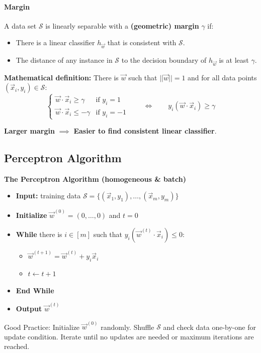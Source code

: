 \paragraph{Margin}
A data set $\mathcal{S}$ is linearly separable with a \textbf{(geometric) margin} $\gamma$ if:
\begin{itemize}
    \item There is a linear classifier $h_{\vec{w}}$ that is consistent with $\mathcal{S}$.
    \item The distance of any instance in $\mathcal{S}$ to the decision boundary of $h_{\vec{w}}$ is at least $\gamma$.
\end{itemize}

\textbf{Mathematical definition:} There is $\vec{w}$ such that $||\vec{w}|| = 1$ and for all data points $(\vec{x}_i, y_i) \in \mathcal{S}$:
\[
\begin{cases}
    \vec{w} \cdot \vec{x}_i \geq \gamma & \text{if } y_i = 1 \\
    \vec{w} \cdot \vec{x}_i \leq -\gamma & \text{if } y_i = -1
\end{cases}
\qquad \Longleftrightarrow \qquad
y_i (\vec{w} \cdot \vec{x}_i) \geq \gamma
\]

\textbf{Larger margin} $\implies$ \textbf{Easier to find consistent linear classifier}.

\subsection{Perceptron Algorithm}

\begin{algobox}
    \textbf{The Perceptron Algorithm (homogeneous \& batch)}

    \begin{itemize}
        \item \textbf{Input:} training data $\mathcal{S} = \{ (\vec{x}_1, y_1), \ldots, (\vec{x}_m, y_m) \}$
        \item \textbf{Initialize} $\vec{w}^{(0)} = (0, \ldots, 0)$ and $t = 0$
        \item \textbf{While} there is $i \in [m]$ such that $y_i (\vec{w}^{(t)} \cdot \vec{x}_i) \leq 0$:
        \begin{itemize}
            \item $\vec{w}^{(t+1)} = \vec{w}^{(t)} + y_i \vec{x}_i$
            \item $t \leftarrow t + 1$
        \end{itemize}
        \item \textbf{End While}
        \item \textbf{Output} $\vec{w}^{(t)}$
    \end{itemize}
\end{algobox}
Good Practice: Initialize $\vec{w}^{(0)}$ randomly. Shuffle $\mathcal{S}$ and check data one-by-one for update condition. Iterate until no updates are needed or maximum iterations are reached.